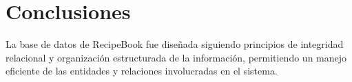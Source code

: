 \documentclass[12pt,a4paper]{article}
\begin{document}
\section{Conclusiones}

La base de datos de RecipeBook fue diseñada siguiendo principios de integridad relacional y organización estructurada de la información, permitiendo un manejo eficiente de las entidades y relaciones involucradas en el sistema.

\end{document}
